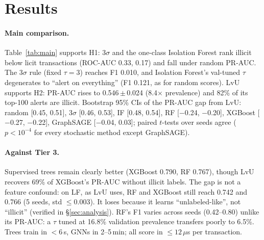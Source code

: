 \documentclass[11pt]{article}
\newcommand{\ours}{LvU}
\begin{document}
\section{Results}
\label{sec:results}

\begin{table}[t]
\centering\footnotesize
\setlength{\tabcolsep}{1.3pt}

\caption{Test results (labeled transactions of steps 35--49), mean\,$\pm$\,std over 5 seeds; $\dagger$: std over 1,000 test bootstrap resamples for the deterministic 3$\sigma$ rule (all metrics). F1 uses $\tau_{\mathrm{F1}}$ tuned on validation (3$\sigma$ rule: $\tau=3$). Best per quality metric in bold (not for steps 43--49, where all methods are near chance); prevalence = random PR-AUC. Period columns split the test set at the dark-market shutdown (step 43); period F1 pools alerts within each period.}
\label{tab:main}
\end{table}

\paragraph{Main comparison.}
Table~\ref{tab:main} supports H1: 3$\sigma$ and the one-class Isolation Forest rank illicit below licit transactions (ROC-AUC 0.33, 0.17) and fall under random PR-AUC.
The 3$\sigma$ rule (fixed $\tau=3$) reaches F1 0.010, and Isolation Forest's val-tuned $\tau$ degenerates to ``alert on everything'' (F1 0.121, as for random scores).
\ours{} supports H2: PR-AUC rises to 0.546\,$\pm$\,0.024 (8.4$\times$ prevalence) and 82\% of its top-100 alerts are illicit.
Bootstrap 95\% CIs of the PR-AUC gap from \ours{}: random [0.45, 0.51], 3$\sigma$ [0.46, 0.53], IF [0.48, 0.54], RF [$-$0.24, $-$0.20], XGBoost [$-$0.27, $-$0.22], GraphSAGE [$-$0.04, 0.03]; paired $t$-tests over seeds agree ($p<10^{-4}$ for every stochastic method except GraphSAGE).

\paragraph{Against Tier 3.}
Supervised trees remain clearly better (XGBoost 0.790, RF 0.767), though \ours{} recovers 69\% of XGBoost's PR-AUC without illicit labels.
The gap is not a feature confound: on LF, as \ours{} uses, RF and XGBoost still reach 0.742 and 0.766 (5 seeds, std $\le$0.003).
It loses because it learns ``unlabeled-like'', not ``illicit'' (verified in \S\ref{sec:analysis}).
RF's F1 varies across seeds (0.42--0.80) unlike its PR-AUC: a $\tau$ tuned at 16.8\% validation prevalence transfers poorly to 6.5\%.
Trees train in ${<}6$\,s, GNNs in 2--5\,min; all score in ${\le}12\,\mu$s per transaction.
\end{document}
